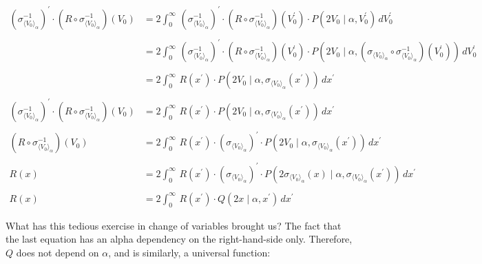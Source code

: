 \documentclass{article}
\begin{document}
\begin{align}
\left(\sigma^{-1}_{\langle V_0 \rangle_\alpha}\right)^{\prime} \cdot \left( R \circ \sigma_{\langle V_0 \rangle_\alpha}^{-1} \right) (V_0) &= 2 \int_0^\infty\, \left(\sigma^{-1}_{\langle V_0 \rangle_\alpha}\right)^{\prime} \cdot \left( R \circ \sigma_{\langle V_0 \rangle_\alpha}^{-1} \right) (V_0^\prime) \cdot P(2V_0 \mid \alpha, V_0^\prime) \, d V_0^\prime\\
\nonumber\\
&= 2 \int_0^\infty\,  \left(\sigma^{-1}_{\langle V_0 \rangle_\alpha}\right)^{\prime} \cdot \left( R \circ \sigma_{\langle V_0 \rangle_\alpha}^{-1} \right) (V_0^\prime) \cdot P(2V_0 \mid \alpha, (\sigma_{\langle V_0 \rangle_\alpha} \circ \sigma_{\langle V_0 \rangle_\alpha}^{-1}) (V_0^\prime) ) \, d V_0^\prime\\
\nonumber\\
&= 2 \int_0^\infty\, R(x^\prime) \cdot P(2V_0 \mid \alpha, \sigma_{\langle V_0 \rangle_\alpha}  (x^\prime) ) \, d x^\prime\\
\nonumber\\
\left(\sigma^{-1}_{\langle V_0 \rangle_\alpha}\right)^{\prime} \cdot \left( R \circ \sigma_{\langle V_0 \rangle_\alpha}^{-1} \right) (V_0) &= 2 \int_0^\infty\, R(x^\prime) \cdot P(2V_0 \mid \alpha, \sigma_{\langle V_0 \rangle_\alpha}  (x^\prime) ) \, d x^\prime\\
\nonumber\\
\left( R \circ \sigma_{\langle V_0 \rangle_\alpha}^{-1} \right) (V_0) &= 2 \int_0^\infty\, R(x^\prime) \cdot \left(\sigma_{\langle V_0 \rangle_\alpha}\right)^{\prime} \cdot P(2V_0 \mid \alpha,\sigma_{\langle V_0 \rangle_\alpha}  (x^\prime) ) \, d x^\prime\\
\nonumber\\
R(x) &= 2 \int_0^\infty\, R(x^\prime) \cdot \left(\sigma_{\langle V_0 \rangle_\alpha}\right)^{\prime} \cdot P(2 \sigma_{\langle V_0 \rangle_\alpha}(x) \mid \alpha, \sigma_{\langle V_0 \rangle_\alpha}  (x^\prime) ) \, d x^\prime\\
\nonumber\\
R(x) &= 2 \int_0^\infty\, R(x^\prime) \cdot  Q(2 x \mid \alpha, x^\prime ) \, d x^\prime
\end{align}

What has this tedious exercise in change of variables brought us? The fact that the last equation has an alpha dependency on the right-hand-side only. Therefore, $Q$ does not depend on $\alpha$, and is similarly, a universal function:
\end{document}
